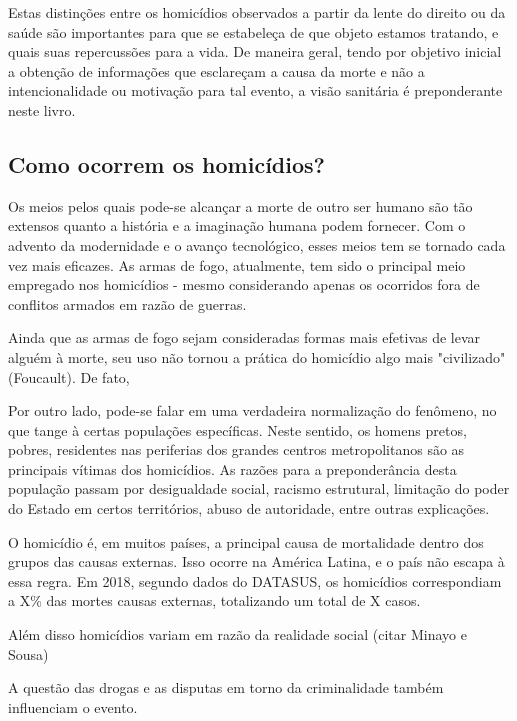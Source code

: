 Estas distinções entre os homicídios observados a partir da lente do direito ou da saúde são importantes para que se estabeleça de que objeto estamos tratando, e quais suas repercussões para a vida. De maneira geral, tendo por objetivo inicial a obtenção de informações que esclareçam a causa da morte e não a intencionalidade ou motivação para tal evento, a visão sanitária é preponderante neste livro.


\subsection{Como ocorrem os homicídios?}

Os meios pelos quais pode-se alcançar a morte de outro ser humano são tão extensos quanto a história e a imaginação humana podem fornecer. Com o advento da modernidade e o avanço tecnológico, esses meios tem se tornado cada vez mais eficazes. As armas de fogo, atualmente, tem sido o principal meio empregado nos homicídios - mesmo considerando apenas os ocorridos fora de conflitos armados em razão de guerras.

Ainda que as armas de fogo sejam consideradas formas mais efetivas de levar alguém à morte, seu uso não tornou a prática do homicídio algo mais "civilizado" (Foucault). De fato, %

Por outro lado, pode-se falar em uma verdadeira normalização do fenômeno, no que tange à certas populações específicas. Neste sentido, os homens pretos, pobres, residentes nas periferias dos grandes centros metropolitanos são as principais vítimas dos homicídios. As razões para a preponderância desta população passam por desigualdade social, racismo estrutural, limitação do poder do Estado em certos territórios, abuso de autoridade, entre outras explicações.


O homicídio é, em muitos países, a principal causa de mortalidade dentro dos grupos das causas externas. Isso ocorre na América Latina, e o país não escapa à essa regra. Em 2018, segundo dados do DATASUS, os homicídios correspondiam a X\% das mortes causas externas, totalizando um total de X casos. 

Além disso homicídios variam em razão da realidade social (citar Minayo e Sousa)

A questão das drogas e as disputas em torno da criminalidade também influenciam o evento.

